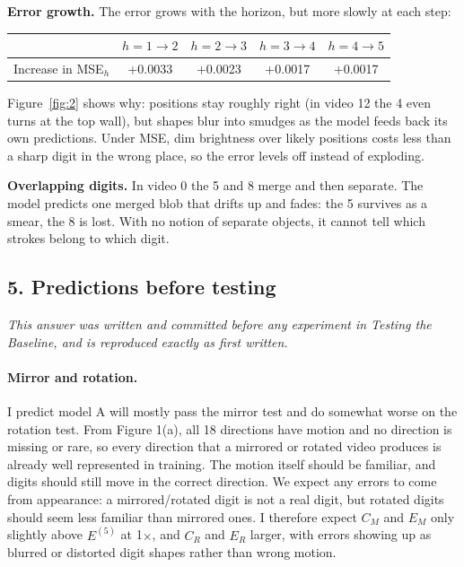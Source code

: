 \documentclass[11pt, a4paper]{article}
\begin{document}
\textbf{Error growth.} The error grows with the horizon, but more slowly at each step:

\begin{center}
\begin{tabular}{lcccc}
\toprule
 & $h=1\to2$ & $h=2\to3$ & $h=3\to4$ & $h=4\to5$ \\
\midrule
Increase in MSE$_h$ & +0.0033 & +0.0023 & +0.0017 & +0.0017 \\
\bottomrule
\end{tabular}
\end{center}

Figure~\ref{fig:2} shows why: positions stay roughly right (in video 12 the 4 even turns at the top wall), but shapes blur into smudges as the model feeds back its own predictions. Under MSE, dim brightness over likely positions costs less than a sharp digit in the wrong place, so the error levels off instead of exploding.

\textbf{Overlapping digits.} In video 0 the 5 and 8 merge and then separate. The model predicts one merged blob that drifts up and fades: the 5 survives as a smear, the 8 is lost. With no notion of separate objects, it cannot tell which strokes belong to which digit.

\subsection*{5. Predictions before testing}

\textit{This answer was written and committed before any experiment in Testing the Baseline, and is reproduced exactly as first written.}

\paragraph{Mirror and rotation.}
I predict model A will mostly pass the mirror test and do somewhat worse on the rotation test. From Figure 1(a), all 18 directions have motion and no direction is missing or rare, so every direction that a mirrored or rotated video produces is already well represented in training. The motion itself should be familiar, and digits should still move in the correct direction. We expect any errors to come from appearance: a mirrored/rotated digit is not a real digit, but rotated digits should seem less familiar than mirrored ones. I therefore expect $C_M$ and $E_M$ only slightly above $E^{(5)}$ at 1$\times$, and $C_R$ and $E_R$ larger, with errors showing up as blurred or distorted digit shapes rather than wrong motion.
\end{document}
